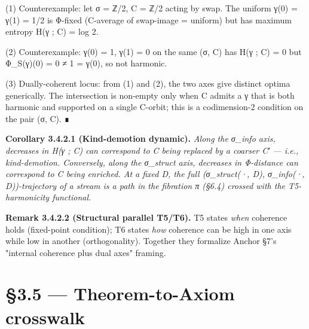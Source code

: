 \documentclass[11pt, openany]{book}
\newcommand{\sectionbreak}{\clearpage}
\begin{document}
(1) Counterexample: let σ = ℤ/2, C = ℤ/2 acting by swap. The uniform γ(0) = γ(1) = 1/2 is Φ-fixed (C-average of swap-image = uniform) but has maximum entropy H(γ ; C) = log 2.

(2) Counterexample: γ(0) = 1, γ(1) = 0 on the same (σ, C) has H(γ ; C) = 0 but Φ\_\allowbreak{}S(γ)(0) = 0 ≠ 1 = γ(0), so not harmonic.

(3) Dually-coherent locus: from (1) and (2), the two axes give distinct optima generically. The intersection is non-empty only when C admits a γ that is both harmonic and supported on a single C-orbit; this is a codimension-2 condition on the pair (σ, C). ∎

\textbf{Corollary 3.4.2.1 (Kind-demotion dynamic).} \textit{Along the σ\_\allowbreak{}info axis, decreases in H(γ ; C) can correspond to C being replaced by a coarser C′ --- i.e., kind-demotion. Conversely, along the σ\_\allowbreak{}struct axis, decreases in Φ-distance can correspond to C being enriched. At a fixed D, the full (σ\_\allowbreak{}struct(·, D), σ\_\allowbreak{}info(·, D))-trajectory of a stream is a path in the fibration π (§6.4) crossed with the T5-harmonicity functional.}

\textbf{Remark 3.4.2.2 (Structural parallel T5/T6).} T5 states \textit{when} coherence holds (fixed-point condition); T6 states \textit{how} coherence can be high in one axis while low in another (orthogonality). Together they formalize Anchor §7's "internal coherence plus dual axes" framing.

\sectionbreak

\section{§3.5 --- Theorem-to-Axiom crosswalk}
\end{document}

